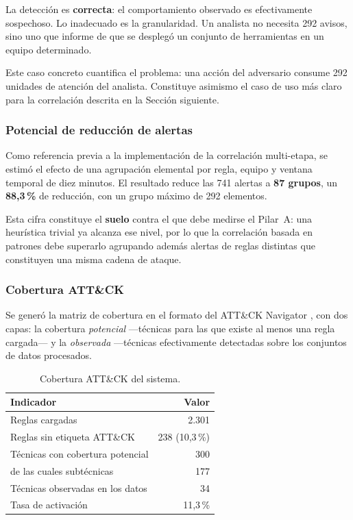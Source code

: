 La detección es \textbf{correcta}: el comportamiento observado es efectivamente sospechoso. Lo
inadecuado es la granularidad. Un analista no necesita 292 avisos, sino uno que informe de que
se desplegó un conjunto de herramientas en un equipo determinado.

Este caso concreto cuantifica el problema: una acción del adversario consume 292 unidades de
atención del analista. Constituye asimismo el caso de uso más claro para la correlación
descrita en la Sección siguiente.

\subsubsection{Potencial de reducción de alertas}

Como referencia previa a la implementación de la correlación multi-etapa, se estimó el efecto
de una agrupación elemental por regla, equipo y ventana temporal de diez minutos. El resultado
reduce las 741 alertas a \textbf{87 grupos}, un \textbf{88,3\,\%} de reducción, con un grupo
máximo de 292 elementos.

Esta cifra constituye el \textbf{suelo} contra el que debe medirse el Pilar~A: una heurística
trivial ya alcanza ese nivel, por lo que la correlación basada en patrones debe superarlo
agrupando además alertas de reglas distintas que constituyen una misma cadena de ataque.

\subsubsection{Cobertura ATT\&CK}

Se generó la matriz de cobertura en el formato del ATT\&CK Navigator \cite{navigator}, con dos
capas: la cobertura \textit{potencial} —técnicas para las que existe al menos una regla
cargada— y la \textit{observada} —técnicas efectivamente detectadas sobre los conjuntos de
datos procesados.

\begin{table}[H]
\centering
\begin{tabular}{|l|r|}
\hline
\textbf{Indicador} & \textbf{Valor} \\
\hline
Reglas cargadas & 2.301 \\
Reglas sin etiqueta ATT\&CK & 238 (10,3\,\%) \\
Técnicas con cobertura potencial & 300 \\
\quad de las cuales subtécnicas & 177 \\
Técnicas observadas en los datos & 34 \\
Tasa de activación & 11,3\,\% \\
\hline
\end{tabular}
\caption{Cobertura ATT\&CK del sistema.}
\label{tab:cobertura-attack}
\end{table}

